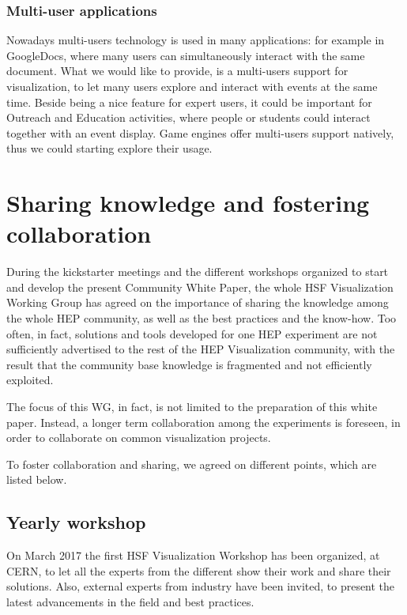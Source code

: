 \documentclass[12pt,a4paper]{article}
\begin{document}
\hypertarget{multi-user}{%
\subsubsection{Multi-user applications}\label{multi-user}}

Nowadays multi-users technology is used in many applications: for example in GoogleDocs, where many users can simultaneously
interact with the same document. What we would like to provide, is a multi-users support for visualization, to let many users
explore and interact with events at the same time. Beside being a nice feature for expert users, it could be important for
Outreach and Education activities, where people or students could interact together with an event display.
Game engines offer multi-users support natively, thus we could starting explore their usage.

\hypertarget{sharing-knowledge}{%
\section{Sharing knowledge and fostering collaboration}\label{sharing-knowledge}}

During the kickstarter meetings and the different workshops organized to start and develop the present Community White Paper,
the whole HSF Visualization Working Group has agreed on the importance of sharing the knowledge among the whole HEP community,
as well as the best practices and the know-how. Too often, in fact, solutions and tools developed for one HEP experiment are
not sufficiently advertised to the rest of the HEP Visualization community, with the result that the community base knowledge
is fragmented and not efficiently exploited.

The focus of this WG, in fact, is not limited to the preparation of this white paper. Instead, a longer term collaboration
among the experiments is foreseen, in order to collaborate on common visualization projects.

To foster collaboration and sharing, we agreed on different points, which are listed below.

\hypertarget{workshop}{%
\subsection{Yearly workshop}\label{workshop}}

On March 2017 the first HSF Visualization Workshop has been organized, at CERN, to let all the experts from the different
show their work and share their solutions. Also, external experts from industry have been invited, to present the latest
advancements in the field and best practices.
\end{document}

